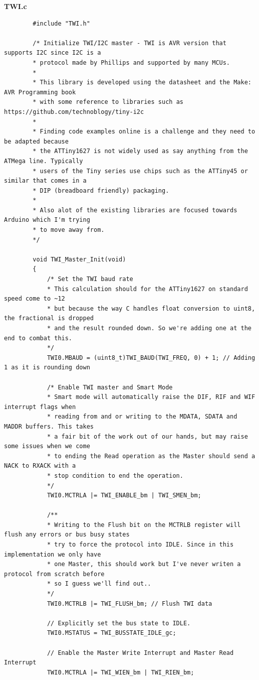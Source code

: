 \documentclass[11pt,a4paper,titlepage]{report}
\begin{document}
	\newpage
	\label{code:twi_c}
	\textbf{TWI.c}
	\begin{lstlisting}
		#include "TWI.h"
		
		/* Initialize TWI/I2C master - TWI is AVR version that supports I2C since I2C is a 
		* protocol made by Phillips and supported by many MCUs.
		* 
		* This library is developed using the datasheet and the Make: AVR Programming book
		* with some reference to libraries such as https://github.com/technoblogy/tiny-i2c
		* 
		* Finding code examples online is a challenge and they need to be adapted because
		* the ATTiny1627 is not widely used as say anything from the ATMega line. Typically
		* users of the Tiny series use chips such as the ATTiny45 or similar that comes in a 
		* DIP (breadboard friendly) packaging. 
		* 
		* Also alot of the existing libraries are focused towards Arduino which I'm trying 
		* to move away from.
		*/
		
		void TWI_Master_Init(void) 
		{
			/* Set the TWI baud rate
			* This calculation should for the ATTiny1627 on standard speed come to ~12
			* but because the way C handles float conversion to uint8, the fractional is dropped 
			* and the result rounded down. So we're adding one at the end to combat this.
			*/ 
			TWI0.MBAUD = (uint8_t)TWI_BAUD(TWI_FREQ, 0) + 1; // Adding 1 as it is rounding down
			
			/* Enable TWI master and Smart Mode
			* Smart mode will automatically raise the DIF, RIF and WIF interrupt flags when
			* reading from and or writing to the MDATA, SDATA and MADDR buffers. This takes
			* a fair bit of the work out of our hands, but may raise some issues when we come 
			* to ending the Read operation as the Master should send a NACK to RXACK with a 
			* stop condition to end the operation. 
			*/
			TWI0.MCTRLA |= TWI_ENABLE_bm | TWI_SMEN_bm;
			
			/**
			* Writing to the Flush bit on the MCTRLB register will flush any errors or bus busy states
			* try to force the protocol into IDLE. Since in this implementation we only have 
			* one Master, this should work but I've never writen a protocol from scratch before
			* so I guess we'll find out..
			*/
			TWI0.MCTRLB |= TWI_FLUSH_bm; // Flush TWI data
			
			// Explicitly set the bus state to IDLE.
			TWI0.MSTATUS = TWI_BUSSTATE_IDLE_gc;
			
			// Enable the Master Write Interrupt and Master Read Interrupt
			TWI0.MCTRLA |= TWI_WIEN_bm | TWI_RIEN_bm;
			

\end{lstlisting}
\end{document}
